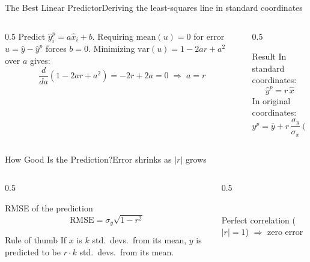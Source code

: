 \documentclass[aspectratio=169,11pt]{beamer}
\begin{document}
\begin{frame}{The Best Linear Predictor}{Deriving the least-squares line in standard coordinates}
  \begin{columns}[T]
    \begin{column}{0.5\textwidth}
      \small
      Predict $\hat y_i^p = a\hat x_i + b$. Requiring $\text{mean}(u)=0$ for
      error $u=\hat y - \hat y^p$ forces $b=0$. Minimizing
      $\text{var}(u) = 1 - 2ar + a^2$ over $a$ gives:
      \[ \frac{d}{da}(1-2ar+a^2) = -2r+2a = 0 \;\Rightarrow\; a = r \]
    \end{column}
    \begin{column}{0.5\textwidth}
      \begin{exampleblock}{Result}
        \small In standard coordinates:
        \[ \hat y^p = r\,\hat x \]
        \small In original coordinates:
        \[ y^p = \bar y + r\,\frac{\sigma_y}{\sigma_x}(x-\bar x) \]
      \end{exampleblock}
    \end{column}
  \end{columns}
\end{frame}

\begin{frame}{How Good Is the Prediction?}{Error shrinks as $|r|$ grows}
  \begin{columns}[T]
    \begin{column}{0.5\textwidth}
      \begin{block}{RMSE of the prediction}
        \[ \text{RMSE} = \sigma_y\sqrt{1-r^2} \]
      \end{block}
      \begin{exampleblock}{Rule of thumb}
        \small If $x$ is $k$ std.\ devs.\ from its mean, $y$ is predicted to
        be $r\cdot k$ std.\ devs.\ from its mean.
      \end{exampleblock}
    \end{column}
    \begin{column}{0.5\textwidth}
      \centering
      \\
      \scriptsize Perfect correlation ($|r|{=}1$) $\Rightarrow$ zero error
    \end{column}
  \end{columns}
\end{frame}
\end{document}
